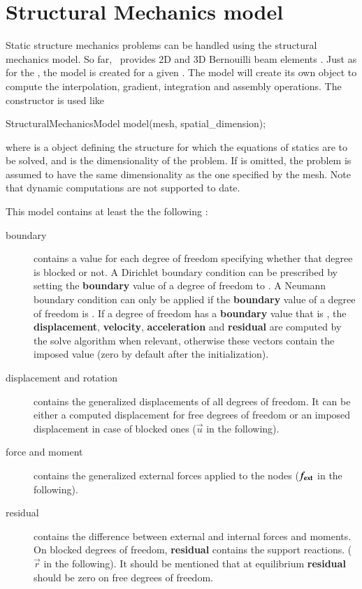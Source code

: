 \section{Structural   Mechanics  model}   Static  structure
mechanics  problems  can be  handled  using  the structural  mechanics
model.  So far,  \akantu\ provides 2D and 3D  Bernouilli beam elements
\cite{REFERENCE}.   Just as  for  the ,  the
model is created  for a given .  The  model will create its
own     object  to  compute   the  interpolation,  gradient,
integration        and         assembly        operations.         The
 constructor is used like

\begin{cpp}
  StructuralMechanicsModel model(mesh, spatial_dimension);
\end{cpp}

where   is  a    object defining  the
structure for  which the  equations of statics  are to be  solved, and
  is the dimensionality  of the  problem.  If
 is  omitted, the problem is  assumed to have
the same  dimensionality as the one  specified by the  mesh. Note that
dynamic computations are not supported to date.


This model contains at least the the following :
\begin{description}
\item[boundary]  contains a   value  for each  degree of
freedom specifying whether that degree  is blocked or not. A Dirichlet
boundary condition can be  prescribed by setting the \textbf{boundary}
value  of a  degree of  freedom  to .   A Neumann  boundary
condition  can only  be applied  if the  \textbf{boundary} value  of a
degree  of freedom  is  . If  a  degree of  freedom has  a
\textbf{boundary}     value      that     is     ,     the
\textbf{displacement},  \textbf{velocity},  \textbf{acceleration}  and
\textbf{residual} are  computed by the solve  algorithm when relevant,
otherwise  these vectors contain  the imposed  value (zero  by default
after the initialization).
  
\item[displacement    and   rotation]    contains    the   generalized
displacements of all  degrees of freedom. It can  be either a computed
displacement for free degrees of freedom or an imposed displacement in
case of blocked ones ($\vec{u}$ in the following).
  
\item[force  and  moment]  contains  the generalized  external  forces
applied to the nodes ($\boldsymbol{f_{{\mathrm{ext}}}}$ in the following).
  
\item[residual] contains the  difference between external and internal
forces and  moments. On blocked degrees  of freedom, \textbf{residual}
contains  the support  reactions.  ($\vec{r}$  in the  following).  It
should be  mentioned that  at equilibrium \textbf{residual}  should be
zero on free degrees of freedom.
\end{description}

